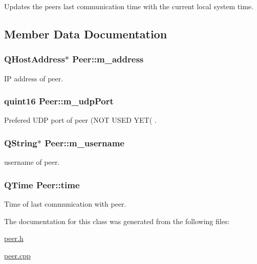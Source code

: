 \-Updates the peers last communication time with the current local system time. 



\subsection{\-Member \-Data \-Documentation}
\hypertarget{class_peer_a30c9db42381e7e0a68d678ae1123dec4}{
\subsubsection[{m\-\_\-address}]{\setlength{\rightskip}{0pt plus 5cm}\-Q\-Host\-Address$\ast$ {\bf \-Peer\-::m\-\_\-address}}}
\label{class_peer_a30c9db42381e7e0a68d678ae1123dec4}


\-I\-P address of peer. 

\hypertarget{class_peer_a799f9277c52571338ddd1bf7555fb48e}{
\subsubsection[{m\-\_\-udp\-Port}]{\setlength{\rightskip}{0pt plus 5cm}quint16 {\bf \-Peer\-::m\-\_\-udp\-Port}}}
\label{class_peer_a799f9277c52571338ddd1bf7555fb48e}


\-Prefered \-U\-D\-P port of peer (\-N\-O\-T \-U\-S\-E\-D \-Y\-E\-T( . 

\hypertarget{class_peer_a5a3effcf505b4c78eed750c78c6ab5de}{
\subsubsection[{m\-\_\-username}]{\setlength{\rightskip}{0pt plus 5cm}\-Q\-String$\ast$ {\bf \-Peer\-::m\-\_\-username}}}
\label{class_peer_a5a3effcf505b4c78eed750c78c6ab5de}


username of peer. 

\hypertarget{class_peer_afec00a147b818f65d238a948d54fc47f}{
\subsubsection[{time}]{\setlength{\rightskip}{0pt plus 5cm}\-Q\-Time {\bf \-Peer\-::time}}}
\label{class_peer_afec00a147b818f65d238a948d54fc47f}


\-Time of last communication with peer. 



\-The documentation for this class was generated from the following files\-:\begin{DoxyCompactItemize}
\item 
\hyperlink{peer_8h}{peer.\-h}\item 
\hyperlink{peer_8cpp}{peer.\-cpp}\end{DoxyCompactItemize}
